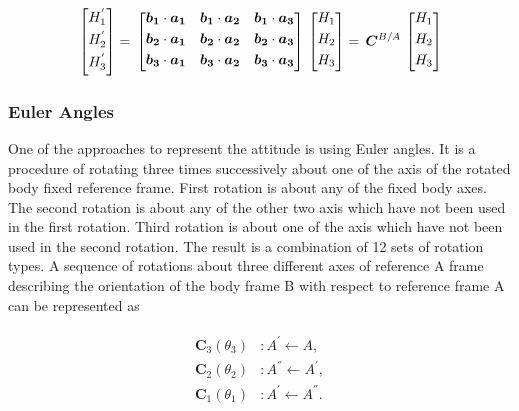 \begin{equation}{\label{transformVectorH}}
\begin{bmatrix}
H_1^{'}\\[0.3em]
H_2^{'}\\[0.3em]
H_3^{'}\\[0.3em]
\end{bmatrix}
=\,
\begin{bmatrix}
 \bm{b_1} \cdot \bm{a_1}  &  \bm{b_1} \cdot \bm{a_2}  &  \bm{b_1} \cdot \bm{a_3} \\[0.3em]
 \bm{b_2} \cdot \bm{a_1}  & \bm{b_2} \cdot \bm{a_2}  & \bm{b_2} \cdot \bm{a_3} \\[0.3em]
 \bm{b_3} \cdot \bm{a_1}  & \bm{b_3} \cdot \bm{a_2}  &  \bm{b_3} \cdot \bm{a_3} \\[0.3em]
\end{bmatrix}
\,
\begin{bmatrix}
 H_1\\[0.3em]
 H_2\\[0.3em]
 H_3\\[0.3em]
\end{bmatrix}
=\,
\bm{C}^{B/A}
\,
\begin{bmatrix}
H_1\\[0.3em]
H_2\\[0.3em]
H_3\\[0.3em]
\end{bmatrix}
\end{equation} 

\subsubsection{Euler Angles}

One of the approaches to represent the attitude is using Euler angles. 
It is a procedure of rotating three times successively about one of the axis of the rotated body fixed reference frame. 
First rotation is about any of the fixed body axes. 
The second rotation is about any of the other two axis which have not been used in the first rotation. 
Third rotation is about one of the axis which have not been used in the second rotation. 
The result is a combination of 12 sets of rotation types. 
A sequence of rotations about three different axes of reference A frame describing the orientation of the body frame B with respect to reference frame A can be represented as

\begin{align}
\label{eqn:sequence}
\begin{split}
{\bm{C}}_3(\theta_{3}) & :      A^{'} \leftarrow A   ,
\\
{\bm{C}}_2(\theta_{2}) & :      A^{''} \leftarrow A^{'}   ,
\\
{\bm{C}}_1(\theta_{1}) & :      A^{'} \leftarrow A^{''}  .
\end{split}
\end{align}

